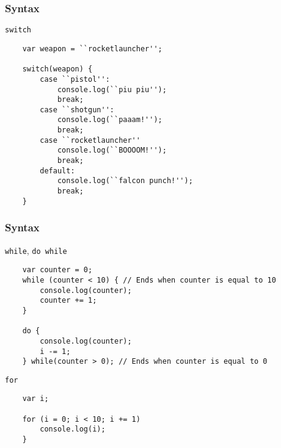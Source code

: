 \begin{frame}[fragile]
  \frametitle{Syntax}

  \begin{block}{\texttt{switch}}
    \scriptsize{
    \begin{verbatim}
    var weapon = ``rocketlauncher'';

    switch(weapon) {
        case ``pistol'':
            console.log(``piu piu'');
            break;
        case ``shotgun'':
            console.log(``paaam!'');
            break;
        case ``rocketlauncher''
            console.log(``BOOOOM!'');
            break;
        default:
            console.log(``falcon punch!'');
            break;
    }
    \end{verbatim}
    }
  \end{block}
\end{frame}

\begin{frame}[fragile]
  \frametitle{Syntax}

  \begin{block}{\texttt{while}, \texttt{do while}}
    \scriptsize{
    \begin{verbatim}
    var counter = 0;
    while (counter < 10) { // Ends when counter is equal to 10
        console.log(counter);
        counter += 1;
    }

    do {
        console.log(counter);
        i -= 1;
    } while(counter > 0); // Ends when counter is equal to 0
    \end{verbatim}
    }
  \end{block}

  \pause

  \begin{block}{\texttt{for}}
    {\scriptsize
    \begin{verbatim}
    var i;

    for (i = 0; i < 10; i += 1)
        console.log(i);
    }
    \end{verbatim}
    }
  \end{block}
\end{frame}
